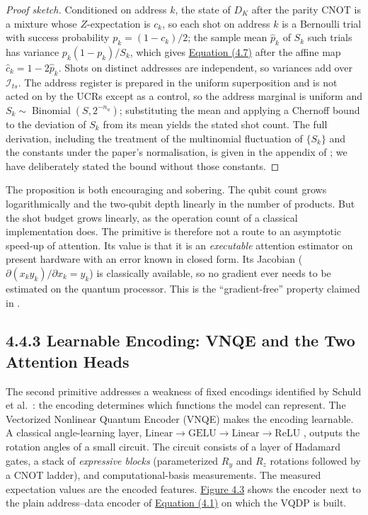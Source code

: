 \documentclass{report}
\theoremstyle{plain}
\theoremstyle{definition}
\theoremstyle{remark}
\begin{document}
\begin{proof}[Proof sketch]
Conditioned on address $k$, the state of $D_K$ after the parity CNOT is a mixture whose $Z$-expectation is $c_k$, so each shot on address $k$ is a Bernoulli trial with success probability $p_k = (1 - c_k)/2$; the sample mean $\hat{p}_k$ of $S_k$ such trials has variance $p_k(1-p_k)/S_k$, which gives \hyperref[eq:qml:vqdp-var]{Equation (4.7)} after the affine map $\hat{c}_k = 1 - 2\hat{p}_k$. Shots on distinct addresses are independent, so variances add over $\mathcal{I}_{ts}$. The address register is prepared in the uniform superposition and is not acted on by the UCRs except as a control, so the address marginal is uniform and $S_k \sim \operatorname{Binomial}(S, 2^{-n_a})$; substituting the mean and applying a Chernoff bound to the deviation of $S_k$ from its mean yields the stated shot count. The full derivation, including the treatment of the multinomial fluctuation of $\{S_k\}$ and the constants under the paper's normalisation, is given in the appendix of \cite{guo2025vqt}; we have deliberately stated the bound without those constants.
\end{proof}

The proposition is both encouraging and sobering. The qubit count grows logarithmically and the two-qubit depth linearly in the number of products. But the shot budget grows linearly, as the operation count of a classical implementation does. The primitive is therefore not a route to an asymptotic speed-up of attention. Its value is that it is an \emph{executable} attention estimator on present hardware with an error known in closed form. Its Jacobian ($\partial (x_k y_k)/\partial x_k = y_k$) is classically available, so no gradient ever needs to be estimated on the quantum processor. This is the ``gradient-free'' property claimed in \cite{guo2025vqt}.

\subsection{4.4.3 Learnable Encoding: VNQE and the Two Attention Heads}\label{sec:qml:vqt:heads}

The second primitive addresses a weakness of fixed encodings identified by Schuld et al.~\cite{schuld2021encoding}: the encoding determines which functions the model can represent. The Vectorized Nonlinear Quantum Encoder (VNQE) makes the encoding learnable. A classical angle-learning layer, $\mathrm{Linear} \to \mathrm{GELU} \to \mathrm{Linear} \to \mathrm{ReLU}$ \cite{hendrycks2016gelu}, outputs the rotation angles of a small circuit. The circuit consists of a layer of Hadamard gates, a stack of \emph{expressive blocks} (parameterized $R_y$ and $R_z$ rotations followed by a CNOT ladder), and computational-basis measurements. The measured expectation values are the encoded features. \hyperref[fig:qml:vnqe]{Figure 4.3} shows the encoder next to the plain address--data encoder of \hyperref[eq:qml:qcrank]{Equation (4.1)} on which the VQDP is built.
\end{document}
